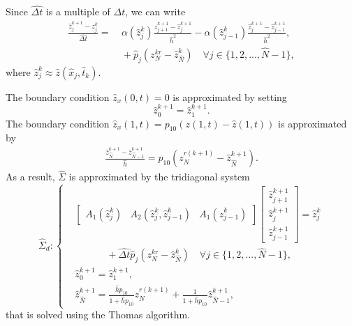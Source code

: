 \documentclass[twocolumn]{autart}
\begin{document}
Since $\widehat{\Delta t}$ is a multiple of $\Delta t$, we can write
\begin{align*}
\frac{\hat{z}_j^{k+1}-z_j^k}{\widehat{\Delta t}} =&~ \alpha(\hat{z}_j^k)\frac{\hat{z}^{k+1}_{j+1}-\hat{z}^{k+1}_j}{\hat{h}^2}-\alpha(\hat{z}^k_{j-1})\frac{\hat{z}^{k+1}_j-\hat{z}^{k+1}_{j-1}}{\hat{h}^2}, \\
&~+\hat{p}_j\left(z_{N}^{kr}-\hat{z}_{\hat{N}}^{k}\right)\quad \forall j\in \{1,2,...,\hat{N}-1\},
\end{align*}
where $\hat{z}_j^k \approx \hat{z}(\hat{x}_j,\hat{t}_k)$.

The boundary condition $\hat{z}_x(0,t)=0$ is approximated by setting 
$$ \hat{z}_0^{k+1} = \hat{z}_1^{k+1}.$$
The boundary condition $\hat{z}_x(1,t) = p_{10}\left(z(1,t)-\hat{z}(1,t)\right)$ is approximated by 
\begin{align*}
\frac{\hat{z}_{\hat{N}}^{k+1}-\hat{z}_{\hat{N}-1}^{k+1}}{\hat{h}} = p_{10}\left(z_{N}^{r(k+1)}-\hat{z}_{\hat{N}}^{k+1}\right). 
\end{align*}
As a result, $\hat{\Sigma}$ is approximated by the tridiagonal system 
\begin{equation*}
\hat{\Sigma}_d : \left\lbrace 
\begin{aligned}
&\begin{bmatrix}
A_1(\hat{z}_j^k) & A_2(\hat{z}_j^k,\hat{z}_{j-1}^k) & A_1(\hat{z}_{j-1}^k)
\end{bmatrix} \begin{bmatrix}
\hat{z}_{j+1}^{k+1} \\ \hat{z}_j^{k+1} \\ \hat{z}_{j-1}^{k+1}
\end{bmatrix} = \hat{z}_j^k \\
&~\qquad \quad +\widehat{\Delta t}\hat{p}_j\left(z_{N}^{kr}-\hat{z}_{\hat{N}}^{k}\right) \quad \forall j\in \{1,2,...,\hat{N}-1\}, \\
&\hat{z}_0^{k+1} = \hat{z}_1^{k+1}, \\
&\hat{z}_{\hat{N}}^{k+1} = \frac{\hat{h}p_{10}}{1+\hat{h}p_{10}}z_N^{r(k+1)}+\frac{1}{1+\hat{h}p_{10}}\hat{z}_{\hat{N}-1}^{k+1},
\end{aligned}
\right.
\end{equation*}
that is solved using the Thomas algorithm. 
\end{document}

